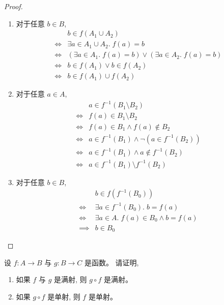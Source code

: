 \documentclass[a4paper, justified]{tufte-handout}
\begin{document}
\begin{proof}
  \begin{enumerate}[(1)]
    \item 对于任意 $b \in B$,
      \begin{align}
        &b \in f(A_{1} \cup A_{2}) \\
        \iff & \exists a \in A_{1} \cup A_{2}.\; f(a) = b \\
        \iff & (\exists a \in A_{1}.\; f(a) = b) \lor (\exists a \in A_{2}.\; f(a) = b) \\
        \iff & b \in f(A_{1}) \lor b \in f(A_{2}) \\
        \iff & b \in f(A_{1}) \cup f({A_{2}})
      \end{align}
    \item 对于任意 $a \in A$,
      \setcounter{equation}{0}
      \begin{align}
        &a \in f^{-1}(B_{1} \setminus B_{2}) \\
        \iff & f(a) \in B_{1} \setminus B_{2} \\
        \iff & f(a) \in B_{1} \land f(a) \notin B_{2} \\
        \iff & a \in f^{-1}(B_{1}) \land \lnot(a \in f^{-1}(B_{2})) \\
        \iff & a \in f^{-1}(B_{1}) \land a \notin f^{-1}(B_{2}) \\
        \iff & a \in f^{-1}(B_{1}) \setminus f^{-1}(B_{2})
      \end{align}
    \item 对于任意 $b \in B$,
      \setcounter{equation}{0}
      \begin{align}
        &b \in f(f^{-1}(B_{0})) \\
        \iff & \exists a \in f^{-1}(B_{0}).\; b = f(a) \\
        \iff & \exists a \in A.\; f(a) \in B_{0} \land b = f(a) \\
        \implies & b \in B_{0}
      \end{align}
  \end{enumerate}
\end{proof}

\begin{problem}[\score{4 = 2 + 2} $\star\star$]
  设 $f: A \to B$ 与 $g: B \to C$ 是函数。
  请证明,
  \begin{enumerate}[(1)]
    \item 如果 $f$ 与 $g$ 是满射, 则 $g \circ f$ 是满射。
    \item 如果 $g \circ f$ 是单射, 则 $f$ 是单射。
  \end{enumerate}
\end{problem}
\end{document}
